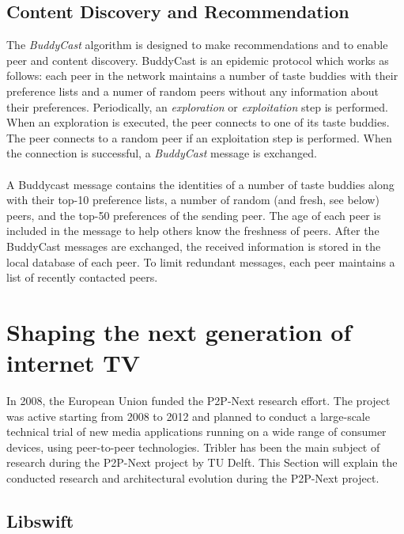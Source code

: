 \subsection{Content Discovery and Recommendation}
The \emph{BuddyCast} algorithm is designed to make recommendations and to enable peer and content discovery. BuddyCast is an epidemic protocol which works as follows: each peer in the network maintains a number of taste buddies with their preference lists and a numer of random peers without any information about their preferences. Periodically, an \emph{exploration} or \emph{exploitation} step is performed. When an exploration is executed, the peer connects to one of its taste buddies. The peer connects to a random peer if an exploitation step is performed. When the connection is successful, a \emph{BuddyCast} message is exchanged.\\\\
A Buddycast message contains the identities of a number of taste buddies along with their top-10 preference lists, a number of random (and fresh, see below) peers, and the top-50 preferences of the sending peer. The age of each peer is included in the message to help others know the freshness of peers. After the BuddyCast messages are exchanged, the received information is stored in the local database of each peer. To limit redundant messages, each peer maintains a list of recently contacted peers.

\section{Shaping the next generation of internet TV}
In 2008, the European Union funded the P2P-Next research effort\cite{p2pnextpressrelease}. The project was active starting from 2008 to 2012 and planned to conduct a large-scale technical trial of new media applications running on a wide range of consumer devices, using peer-to-peer technologies. Tribler has been the main subject of research during the P2P-Next project by TU Delft. This Section will explain the conducted research and architectural evolution during the P2P-Next project.

\subsection{Libswift}


